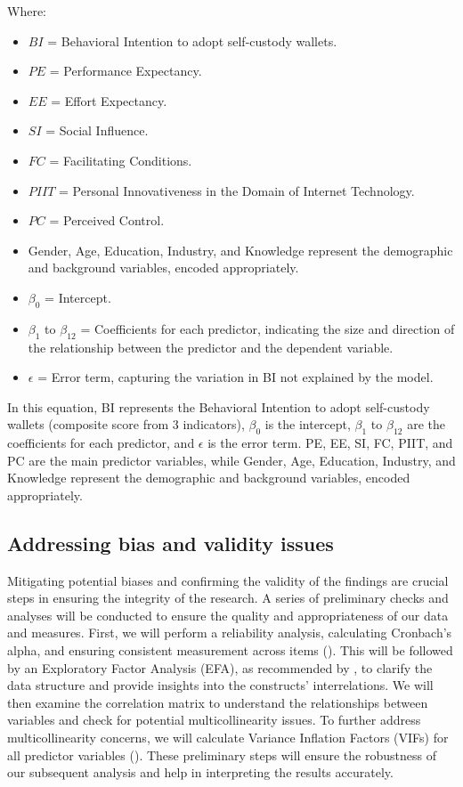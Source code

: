 \documentclass[twocolumn]{article}
\begin{document}
Where:
\begin{itemize}
    \item \(BI\) = Behavioral Intention to adopt self-custody wallets.
    \item \(PE\) = Performance Expectancy.
    \item \(EE\) = Effort Expectancy.
    \item \(SI\) = Social Influence.
    \item \(FC\) = Facilitating Conditions.
    \item \(PIIT\) = Personal Innovativeness in the Domain of Internet Technology.
    \item \(PC\) = Perceived Control.
    \item Gender, Age, Education, Industry, and Knowledge represent the demographic and background variables, encoded appropriately.
    \item \(\beta_0\) = Intercept.
    \item \(\beta_1\) to \(\beta_{12}\) = Coefficients for each predictor, indicating the size and direction of the relationship between the predictor and the dependent variable.
    \item \(\epsilon\) = Error term, capturing the variation in BI not explained by the model.
\end{itemize}

In this equation, BI represents the Behavioral Intention to adopt self-custody wallets (composite score from 3 indicators), $\beta_0$ is the intercept, $\beta_1$ to $\beta_12$ are the coefficients for each predictor, and $\epsilon$ is the error term. PE, EE, SI, FC, PIIT, and PC are the main predictor variables, while Gender, Age, Education, Industry, and Knowledge represent the demographic and background variables, encoded appropriately.


\subsection{Addressing bias and validity issues}

Mitigating potential biases and confirming the validity of the findings are crucial steps in ensuring the integrity of the research. A series of preliminary checks and analyses will be conducted to ensure the quality and appropriateness of our data and measures. First, we will perform a reliability analysis, calculating Cronbach's alpha, and ensuring consistent measurement across items (\cite{eisinga_reliability_2013}). This will be followed by an Exploratory Factor Analysis (EFA), as recommended by \textcite{costello_best_2005}, to clarify the data structure and provide insights into the constructs' interrelations. We will then examine the correlation matrix to understand the relationships between variables and check for potential multicollinearity issues. To further address multicollinearity concerns, we will calculate Variance Inflation Factors (VIFs) for all predictor variables (\cite{mukaka_guide_2012}). These preliminary steps will ensure the robustness of our subsequent analysis and help in interpreting the results accurately.
\end{document}
